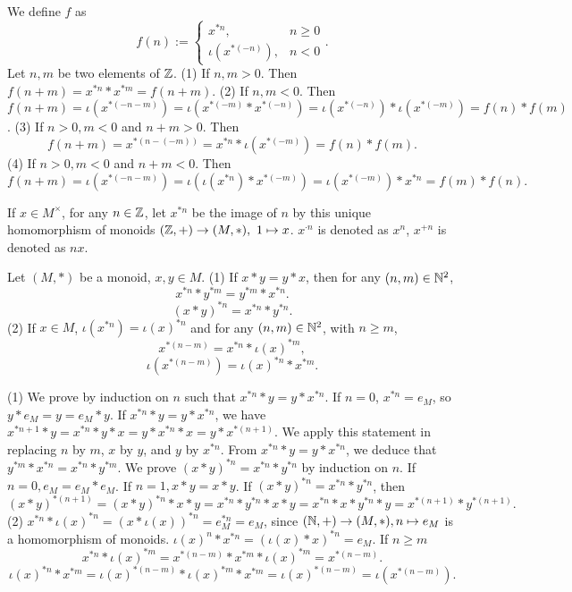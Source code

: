 \documentclass{book}
\numberwithin{equation}{section}
\begin{document}
\begin{proofenv}
    We define $f$ as 
    $$f(n):=\left\{\begin{matrix}
        x^{*n},&n\ge 0\\
        \iota(x^{*(-n)}),&n<0
    \end{matrix}\right. .$$
    Let $n,m$ be two elements of $\mathbb{Z}$.
    \newline
    (1) If $n,m>0$. Then $f(n+m)=x^{*n}*x^{*m}=f(n+m)$.
    \newline
    (2) If $n,m<0$. Then $f(n+m)=\iota(x^{*(-n-m)})=\iota(x^{*(-m)}*x^{*(-n)})=\iota(x^{*(-n)})*\iota(x^{*(-m)})=f(n)*f(m)$.
    \newline
    (3) If $n>0,m<0$ and $n+m>0$. Then $$f(n+m)=x^{*(n-(-m))}=x^{*n}*\iota(x^{*(-m)})=f(n)*f(m).$$
    (4) If $n>0,m<0$ and $n+m<0$. Then $$f(n+m)=\iota(x^{*(-n-m)})=\iota(\iota(x^{*n})*x^{*(-m)})=\iota(x^{*(-m)})*x^{*n}=f(m)*f(n).$$
\end{proofenv}
\begin{notationenv}
    If $x\in M^\times$, for any $n\in \mathbb{Z}$, let $x^{*n}$ be the image of $n$ by this unique homomorphism of monoids $(\mathbb{Z},+)\rightarrow (M,*),\ 1\mapsto x$. $x^{\cdot n}$ is denoted as $x^n$, $x^{+n}$ is denoted as $nx$.
\end{notationenv}
\begin{propositionenv}
    Let $(M,*)$ be a monoid, $x,y\in M$.
    \newline
    (1) If $x*y=y*x$, then for any $(n,m)\in \mathbb{N}^2$,
     $$x^{*n}*y^{*m}=y^{*m}*x^{*n}.$$ 
     $$(x*y)^{*n}=x^{*n}*y^{*n}.$$
    \newline
    (2) If $x\in M$, $\iota(x^{*n})=\iota(x)^{*n}$ and for any $(n,m)\in \mathbb{N}^2$, with $n\ge m$,
    $$x^{*(n-m)}=x^{*n}*\iota(x)^{*m},$$
    $$\iota(x^{*(n-m)})=\iota(x)^{*n}*x^{*m}.$$
\end{propositionenv}
\begin{proofenv}
   \quad
   \newline
    (1) We prove by induction on $n$ such that $x^{*n}*y=y*x^{*n}$.
    If $n=0$, $x^{*n}=e_M$, so $y*e_M=y=e_M*y$. If $x^{*n}*y=y*x^{*n}$, we have $x^{*n+1}*y=x^{*n}*y*x=y*x^{*n}*x=y*x^{*(n+1)}$. We apply this  statement in replacing $n$ by $m$, $x$ by $y$, and $y$ by $x^{*n}$. From $x^{*n}*y=y*x^{*n}$, we deduce that $y^{*m}*x^{*n}=x^{*n}*y^{*m}$. We prove $(x*y)^{*n}=x^{*n}*y^{*n}$ by induction on $n$. If $n=0,e_M=e_M*e_M$. If $n=1,x*y=x*y$. If $(x*y)^{*n}=x^{*n}*y^{*n}$, then $$(x*y)^{*(n+1)}=(x*y)^{*n}*x*y=x^{*n}*y^{*n}*x*y=x^{*n}*x*y^{*n}*y=x^{*(n+1)}*y^{*(n+1)}.$$
    (2) $x^{*n}*\iota(x)^{*n}=(x*\iota(x))^{*n}=e_{M}^{*n} = e_{M}$, since $(\mathbb{N},+)\rightarrow (M,*), n\mapsto e_M$ is a homomorphism of monoids. $\iota(x)^n* x^{*n} = (\iota(x) * x)^{*n} = e_{M}$. If $n \geq m$ 
$$
x^{*n} * \iota(x)^{*m} = x^{*(n-m)} * x^{*m} * \iota(x)^{*m} = x^{*(n-m)}
.$$
$$
\iota(x)^{*n} * x^{*m} = \iota(x)^{*(n-m)} * \iota(x)^{*m} * x^{*m}=\iota(x)^{*(n-m)}=\iota(x^{*(n-m)})
.$$
\end{proofenv}
\end{document}
